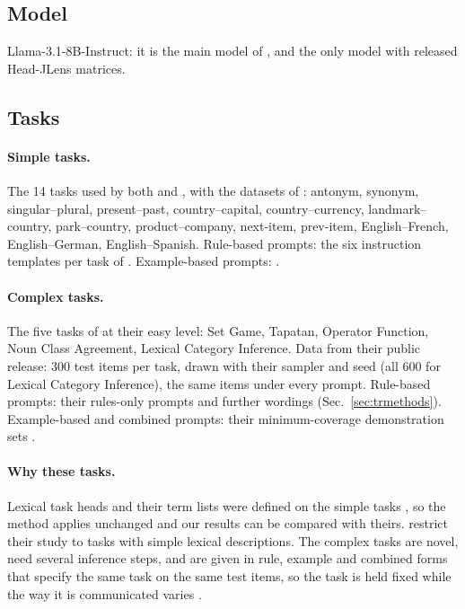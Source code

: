 \documentclass[11pt,a4paper]{article}
\begin{document}
\subsection{Model}\label{sec:model}
Llama-3.1-8B-Instruct: it is the main model of \citet{yang2026shared}, and the only model with released Head-JLens matrices.

\subsection{Tasks}\label{sec:tasks}
\paragraph{Simple tasks.} The 14 tasks used by both \citet{yang2026shared} and \citet{davidson2025different}, with the datasets of \citet{todd2024function}: antonym, synonym, singular--plural, present--past, country--capital, country--currency, landmark--country, park--country, product--company, next-item, prev-item, English--French, English--German, English--Spanish.
Rule-based prompts: the six instruction templates per task of \citet[App.~A.3.1]{yang2026shared}.
Example-based prompts: \citet[App.~A.3]{yang2026shared}.

\paragraph{Complex tasks.} The five tasks of \citet{fu2026rules} at their easy level: Set Game, Tapatan, Operator Function, Noun Class Agreement, Lexical Category Inference. Data from their public release: 300 test items per task, drawn with their sampler and seed (all 600 for Lexical Category Inference), the same items under every prompt.
Rule-based prompts: their rules-only prompts \citep[App.~F]{fu2026rules} and further wordings (Sec.~\ref{sec:trmethods}).
Example-based and combined prompts: their minimum-coverage demonstration sets \citep[Sec.~2.5]{fu2026rules}.

\paragraph{Why these tasks.} Lexical task heads and their term lists were defined on the simple tasks \citep{yang2026shared}, so the method applies unchanged and our results can be compared with theirs. \citet[Sec.~4]{yang2026shared} restrict their study to tasks with simple lexical descriptions. The complex tasks are novel, need several inference steps, and are given in rule, example and combined forms that specify the same task on the same test items, so the task is held fixed while the way it is communicated varies \citep[Sec.~1--2]{fu2026rules}.
\end{document}
